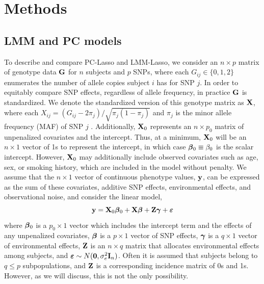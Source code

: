 \section{Methods} \label{sec:methods}



\subsection{LMM and PC models}

To describe and compare PC-Lasso and LMM-Lasso, we consider an $n \times p$ matrix of genotype data $\textbf{G}$ for $n$ subjects and $p$ SNPs, where each $G_{ij} \in \{ 0, 1, 2 \}$ enumerates the number of allele copies subject $i$ has for SNP $j$. In order to equitably compare SNP effects, regardless of allele frequency, in practice $\textbf{G}$ is standardized. We denote the standardized version of this genotype matrix as $\textbf{X}$, where each $X_{ij} = (G_{ij} - 2 \pi_j) / \sqrt{\pi_j (1 - \pi_j)}$ and $\pi_j$ is the minor allele frequency (MAF) of SNP $j$ \citep{zhang2015principal, price2006principal}. Additionally, $\textbf{X}_0$ represents an $n \times p_0$ matrix of unpenalized covariates and the intercept. Thus, at a minimum, $\textbf{X}_0$ will be an $n \times 1$ vector of 1s to represent the intercept, in which case $\boldsymbol{\beta}{}_0 \equiv \beta_0$ is the scalar intercept. However, $\textbf{X}_0$ may additionally include observed covariates such as age, sex, or smoking history, which are included in the model without penalty. We assume that the $n \times 1$ vector of continuous phenotype values, $\textbf{y}$, can be expressed as the sum of these covariates, additive SNP effects, environmental effects, and observational noise, and consider the linear model,
\begin{equation}
    \label{eqn:model}
    \textbf{y} = \textbf{X}_0 \boldsymbol{\beta}{}_0 + \textbf{X}\boldsymbol{\beta}{} + \textbf{Z}\boldsymbol{\gamma} + \boldsymbol{\varepsilon}{}
\end{equation}
where $\boldsymbol{\beta}{}_0$ is a $p_0 \times 1$ vector which includes the intercept term and the effects of any unpenalized covariates, $\boldsymbol{\beta}{}$ is a $p \times 1$ vector of SNP effects, $\boldsymbol{\gamma}$ is a $q \times 1$ vector of environmental effects, $\textbf{Z}$ is an $n \times q$ matrix that allocates environmental effects among subjects, and $\boldsymbol{\varepsilon}{} \sim N(\boldsymbol{0}, \sigma^2_e \textbf{I}_n)$. Often it is assumed that subjects belong to $q \le p$ subpopulations, and $\textbf{Z}$ is a corresponding incidence matrix of 0s and 1s. However, as we will discuss, this is not the only possibility.


